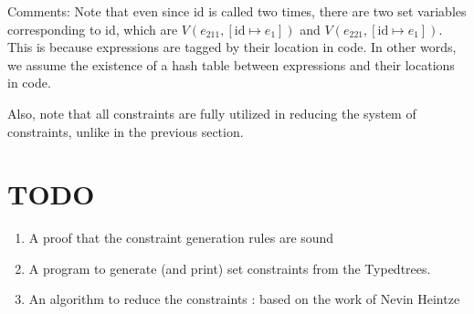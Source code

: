 \documentclass{article}
\begin{document}
Comments: Note that even since id is called two times, there are two set variables corresponding to id, which are $V(e_{211},[\text{id}\mapsto e_{1}])$ and $V(e_{221},[\text{id}\mapsto e_{1}])$.
This is because expressions are tagged by their location in code.
In other words, we assume the existence of a hash table between expressions and their locations in code.

Also, note that all constraints are fully utilized in reducing the system of constraints, unlike in the previous section.

\section{TODO}
\begin{enumerate}
  \item A proof that the constraint generation rules are sound
  \item A program to generate (and print) set constraints from the Typedtrees.
  \item An algorithm to reduce the constraints : based on the work of Nevin Heintze\cite{Hei91}
\end{enumerate}
\printbibliography
\end{document}
